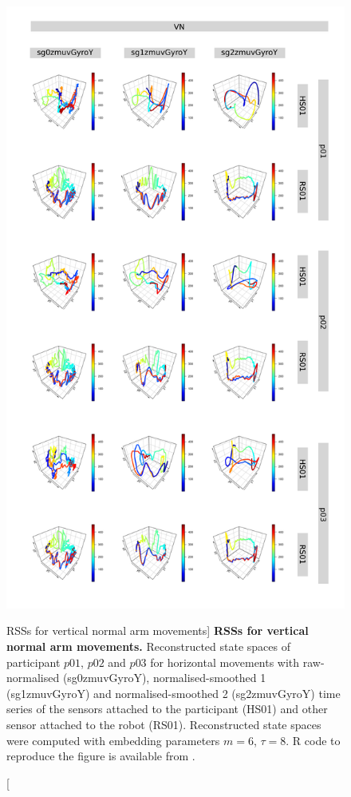 \begin{figure}
\centering
\includegraphics[height=0.85\textheight]{rss_VN}
\caption
	[RSSs for vertical normal arm movements]{
	{\bf RSSs for vertical normal arm movements.}
	Reconstructed state spaces %
	of participant $p01$, $p02$ and $p03$ for horizontal movements 
	with raw-normalised (sg0zmuvGyroY), 
	normalised-smoothed 1 (sg1zmuvGyroY) and 
	normalised-smoothed 2 (sg2zmuvGyroY) time series of the 
	sensors attached to the participant (HS01) and other sensor 
	attached to the robot (RS01).	
	Reconstructed state spaces were computed with 
	embedding parameters $m=6$, $\tau=8$.
	R code to reproduce the figure is available from \cite{hwum2018}.
        }
    \label{fig:rss_VN}
\end{figure}

